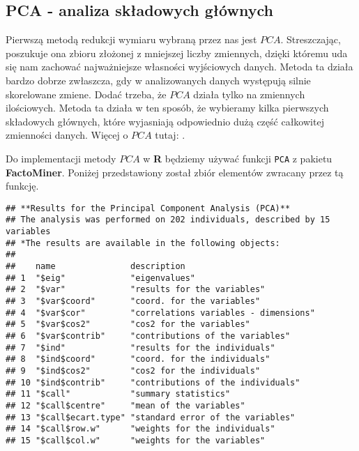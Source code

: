 \documentclass[12pt, a4paper]{article}\usepackage[]{graphicx}\usepackage[]{xcolor}
\makeatletter
\newenvironment{kframe}{%
 \def\at@end@of@kframe{}%
 \ifinner\ifhmode%
  \def\at@end@of@kframe{\end{minipage}}%
  \begin{minipage}{\columnwidth}%
 \fi\fi%
 \def\FrameCommand##1{\hskip\@totalleftmargin \hskip-\fboxsep
 \colorbox{shadecolor}{##1}\hskip-\fboxsep
     \hskip-\linewidth \hskip-\@totalleftmargin \hskip\columnwidth}%
 \MakeFramed {\advance\hsize-\width
   \@totalleftmargin\z@ \linewidth\hsize
   \@setminipage}}%
 {\par\unskip\endMakeFramed%
 \at@end@of@kframe}
\newenvironment{knitrout}{}{} %
\makeatother
\begin{document}
\subsection{PCA - analiza składowych głównych}
Pierwszą metodą redukcji wymiaru wybraną przez nas jest $PCA$. Streszczając, poszukuje ona zbioru złożonej z mniejszej liczby zmiennych, dzięki któremu uda się nam zachować najważniejsze własności wyjściowych danych. Metoda ta działa bardzo dobrze zwłaszcza, gdy w analizowanych danych występują silnie skorelowane zmiene. Dodać trzeba, że $PCA$ działa tylko na zmiennych ilościowych. Metoda ta działa w ten sposób, że wybieramy kilka pierwszych składowych głównych, które wyjasniają odpowiednio dużą część całkowitej zmienności danych. Więcej o $PCA$ tutaj: \cite{PCA}. 




Do implementacji metody $PCA$ w \textbf{R} będziemy używać funkcji \texttt{PCA} \cite{PCA_R} z pakietu \textbf{FactoMiner}. Poniżej przedstawiony został zbiór elementów zwracany przez tą funkcję. 

\begin{knitrout}
\color{fgcolor}\begin{kframe}
\begin{verbatim}
## **Results for the Principal Component Analysis (PCA)**
## The analysis was performed on 202 individuals, described by 15 variables
## *The results are available in the following objects:
## 
##    name               description                          
## 1  "$eig"             "eigenvalues"                        
## 2  "$var"             "results for the variables"          
## 3  "$var$coord"       "coord. for the variables"           
## 4  "$var$cor"         "correlations variables - dimensions"
## 5  "$var$cos2"        "cos2 for the variables"             
## 6  "$var$contrib"     "contributions of the variables"     
## 7  "$ind"             "results for the individuals"        
## 8  "$ind$coord"       "coord. for the individuals"         
## 9  "$ind$cos2"        "cos2 for the individuals"           
## 10 "$ind$contrib"     "contributions of the individuals"   
## 11 "$call"            "summary statistics"                 
## 12 "$call$centre"     "mean of the variables"              
## 13 "$call$ecart.type" "standard error of the variables"    
## 14 "$call$row.w"      "weights for the individuals"        
## 15 "$call$col.w"      "weights for the variables"
\end{verbatim}


{\ttfamily\noindent\itshape\color{messagecolor}{\#\# starting httpd help server ... done}}\end{kframe}
\end{knitrout}
\end{document}
